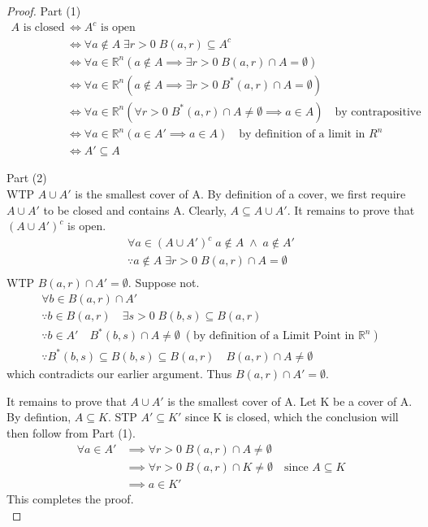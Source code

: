 \documentclass[11pt, oneside]{book}
\theoremstyle{break}
\newtheorem*{proof}{Proof}
\newcommand{\bb}[1]{\mathbb{#1}}			%
\begin{document}
\begin{proof}
	Part (1)
	\begin{align*}
		A \text{ is closed} &\iff A^c \text{ is open} \\
							&\iff \forall a \notin A \; \exists r > 0 \; B(a, r) \subseteq A^c \\
							&\iff \forall a \in \bb{R}^n (a \notin A \implies \exists r > 0 \; B(a, r) \cap A = \emptyset) \\
							&\iff \forall a \in \bb{R}^n (a \notin A \implies \exists r > 0 \; B^*(a, r) \cap A = \emptyset) \\
							&\iff \forall a \in \bb{R}^n (\forall r > 0 \; B^*(a, r) \cap A \neq \emptyset \implies a \in A) \quad \text{by contrapositive} \\
							&\iff \forall a \in \bb{R}^n (a \in A' \implies a \in A) \quad \text{by definition of a limit in $R^n$} \\
							&\iff A' \subseteq A
	\end{align*}

	Part (2) \\
	WTP $A \cup A'$ is the smallest cover of A. By definition of a cover, we first require $A \cup A'$ to be closed and contains A. Clearly, $A \subseteq A \cup A'$. It remains to prove that $(A \cup A')^c$ is open.
	\begin{gather*}
		\forall a \in (A \cup A')^c \; a \notin A \; \land \; a \notin A' \\
		\because a \notin A \; \exists r > 0 \; B(a, r) \cap A = \emptyset \\
	\end{gather*}
	WTP $B(a, r) \cap A' = \emptyset$. Suppose not.
	\begin{gather*}
		\forall b \in B(a, r) \cap A' \\
		\because b \in B(a, r) \quad \exists s > 0 \; B(b, s) \subseteq B(a, r) \\
		\because b \in A' \quad B^*(b, s) \cap A \neq \emptyset \; (\text{by definition of a Limit Point in $\bb{R}^n$}) \\
		\because B^*(b, s) \subseteq B(b, s) \subseteq B(a, r) \quad B(a, r) \cap A \neq \emptyset
	\end{gather*}
	which contradicts our earlier argument. Thus $B(a, r) \cap A' = \emptyset$.

	It remains to prove that $A \cup A'$ is the smallest cover of A. Let K be a cover of A. By defintion, $A \subseteq K$. STP $A' \subseteq K'$ since K is closed, which the conclusion will then follow from Part (1).
	\begin{align*}
		\forall a \in A' &\implies \forall r > 0 \; B(a, r) \cap A \neq \emptyset \\
						 &\implies \forall r > 0 \; B(a, r) \cap K \neq \emptyset \quad \text{since } A \subseteq K \\
						 &\implies a \in K'
	\end{align*}
	This completes the proof. \\


\end{proof}
\end{document}
